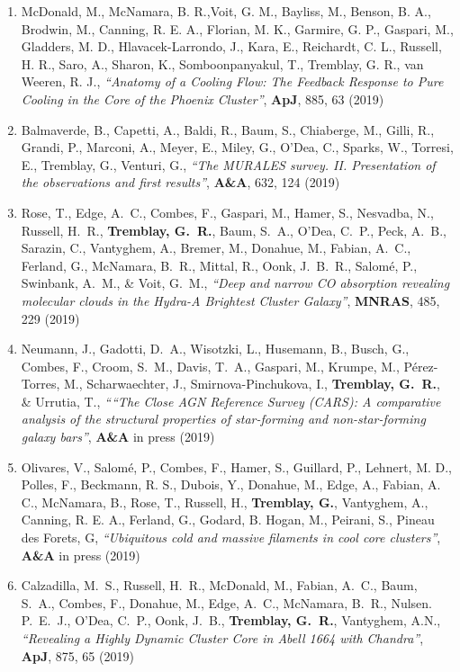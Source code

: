 \documentclass[11pt]{article}
\begin{document}
\begin{enumerate}[resume]
\item McDonald, M., McNamara, B. R.,Voit, G. M., Bayliss, M., Benson, B. A., Brodwin, M., Canning, R. E. A., Florian, M. K., Garmire, G. P., Gaspari, M., Gladders, M. D., Hlavacek-Larrondo, J., Kara, E., Reichardt, C. L., Russell, H. R., Saro, A., Sharon, K., Somboonpanyakul, T., Tremblay, G. R., van Weeren, R. J., \textit{``Anatomy of a Cooling Flow: The Feedback Response to Pure Cooling in the Core of the Phoenix Cluster''}, \textbf{ApJ}, 885, 63 (2019)


\item Balmaverde, B., Capetti, A., Baldi, R., Baum, S., Chiaberge, M., Gilli, R., Grandi, P., Marconi, A., Meyer, E., Miley, G., O'Dea, C., Sparks, W., Torresi, E., Tremblay, G., Venturi, G., \textit{``The MURALES survey. II. Presentation of the observations and first results''}, \textbf{A\&A}, 632, 124 (2019)

\item Rose, T., Edge, A.~C., Combes, F., Gaspari, M., Hamer, S., Nesvadba, N.,
Russell, H.~R., \textbf{Tremblay, G.~R.}, Baum, S.~A., O'Dea, C.~P., Peck, A.~B.,
Sarazin, C., Vantyghem, A., Bremer, M., Donahue, M., Fabian, A.~C., Ferland, G.,
McNamara, B.~R., Mittal, R., Oonk, J.~B.~R., Salom\'{e}, P., Swinbank, A.~M.,
\& Voit, G.~M., \textit{``Deep and narrow CO absorption revealing molecular clouds in the Hydra-A Brightest Cluster Galaxy''}, \textbf{MNRAS}, 485, 229 (2019)


\item Neumann, J., Gadotti, D.~A., Wisotzki, L., Husemann, B., Busch, G.,
Combes, F., Croom, S.~M., Davis, T.~A., Gaspari, M., Krumpe, M., P\'{e}rez-Torres,
M., Scharwaechter, J., Smirnova-Pinchukova, I., \textbf{Tremblay, G.~R.},
\& Urrutia, T., \textit{````The Close AGN Reference Survey (CARS): A comparative analysis of the structural properties of star-forming and non-star-forming galaxy bars''},
\textbf{A\&A} in press (2019)


\item Olivares, V., Salomé, P., Combes, F., Hamer, S., Guillard, P., Lehnert, M. D., Polles, F., Beckmann, R. S., Dubois, Y., Donahue, M., Edge, A., Fabian, A. C., McNamara, B., Rose, T., Russell, H., \textbf{Tremblay, G.}, Vantyghem, A., Canning, R. E. A., Ferland, G., Godard, B. Hogan, M., Peirani, S., Pineau des Forets, G, \textit{``Ubiquitous cold and massive filaments in cool core clusters''}, \textbf{A\&A} in press (2019)



\item Calzadilla, M.~S., Russell, H.~R., McDonald, M., Fabian, A.~C., Baum, S.~A., Combes, F., Donahue, M., Edge, A.~C., McNamara, B.~R., Nulsen. P.~E.~J., O'Dea, C.~P., Oonk, J.~B., \textbf{Tremblay, G.~R.}, Vantyghem, A.N., \textit{``Revealing a Highly Dynamic Cluster Core in Abell 1664 with Chandra''}, \textbf{ApJ}, 875, 65 (2019)





\end{enumerate}
\end{document}
